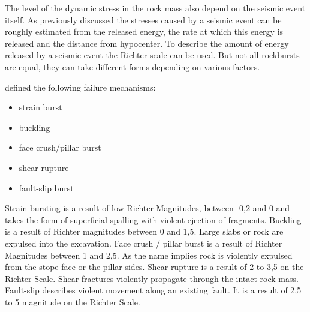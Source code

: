 The level of the dynamic stress in the rock mass also depend on the seismic event itself.
As previously discussed the stresses caused by a seismic event can be roughly estimated from the released energy, the rate at which this energy is released and the distance from hypocenter. To describe the amount of energy released by a seismic event the Richter scale can be used.
But not all rockbursts are equal, they can take different forms depending on various factors.



\textcite{Ortlepp97Fracture} defined the following failure mechanisms:

\begin{itemize}
\item strain burst
\item buckling
\item face crush/pillar burst
\item shear rupture
\item fault-slip burst
\end{itemize}

Strain bursting is a result of low Richter Magnitudes, between -0,2 and 0 and takes the form of superficial spalling with violent ejection of fragments. 
Buckling is a result of Richter magnitudes between 0 and 1,5. Large slabs or rock are expulsed into the excavation.
Face crush / pillar burst is a result of Richter Magnitudes between 1 and 2,5. As the name implies rock is violently expulsed from the stope face or the pillar sides.
Shear rupture is a result of 2 to 3,5 on the Richter Scale. Shear fractures violently propagate through the intact rock mass. 
Fault-slip describes violent movement along an existing fault. It is a result of 2,5 to 5 magnitude on the Richter Scale.

